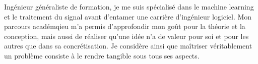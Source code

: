 

\begin{cvparagraph}
	Ingénieur généraliste de formation, je me suis spécialisé dans le machine learning et le traitement du signal avant d'entamer une carrière d'ingénieur logiciel. Mon parcours académqieu m'a permis d'approfondir mon goût pour la théorie et la conception, mais aussi de réaliser qu'une idée n'a de valeur pour soi et pour les autres que dans sa concrétisation. Je considère ainsi que maîtriser véritablement un problème consiste à le rendre tangible sous tous ses aspects. \\
\end{cvparagraph}
